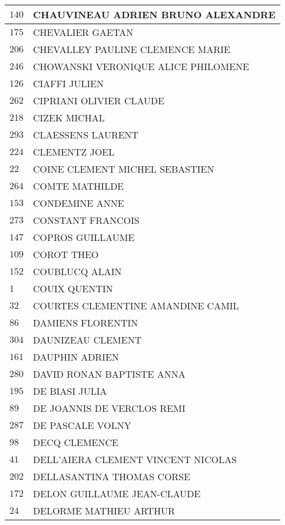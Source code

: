 \begin{xltabular}{\linewidth}{|l|X|}
    \hline
    $140$ & CHAUVINEAU ADRIEN BRUNO ALEXANDRE \\
    \hline
    $175$ & CHEVALIER GAETAN \\
    \hline
    $206$ & CHEVALLEY PAULINE CLEMENCE MARIE \\
    \hline
    $246$ & CHOWANSKI VERONIQUE ALICE PHILOMENE \\
    \hline
    $126$ & CIAFFI JULIEN \\
    \hline
    $262$ & CIPRIANI OLIVIER CLAUDE \\
    \hline
    $218$ & CIZEK MICHAL \\
    \hline
    $293$ & CLAESSENS LAURENT \\
    \hline
    $224$ & CLEMENTZ JOEL \\
    \hline
    $22$ & COINE CLEMENT MICHEL SEBASTIEN \\
    \hline
    $264$ & COMTE MATHILDE \\
    \hline
    $153$ & CONDEMINE ANNE \\
    \hline
    $273$ & CONSTANT FRANCOIS \\
    \hline
    $147$ & COPROS GUILLAUME \\
    \hline
    $109$ & COROT THEO \\
    \hline
    $152$ & COUBLUCQ ALAIN \\
    \hline
    $1$ & COUIX QUENTIN \\
    \hline
    $32$ & COURTES CLEMENTINE AMANDINE CAMIL \\
    \hline
    $86$ & DAMIENS FLORENTIN \\
    \hline
    $304$ & DAUNIZEAU CLEMENT \\
    \hline
    $161$ & DAUPHIN ADRIEN \\
    \hline
    $280$ & DAVID RONAN BAPTISTE ANNA \\
    \hline
    $195$ & DE BIASI JULIA \\
    \hline
    $89$ & DE JOANNIS DE VERCLOS REMI \\
    \hline
    $287$ & DE PASCALE VOLNY \\
    \hline
    $98$ & DECQ CLEMENCE \\
    \hline
    $41$ & DELL'AIERA CLEMENT VINCENT NICOLAS \\
    \hline
    $202$ & DELLASANTINA THOMAS CORSE \\
    \hline
    $172$ & DELON GUILLAUME JEAN-CLAUDE \\
    \hline
    $24$ & DELORME MATHIEU ARTHUR \\

\end{xltabular}

